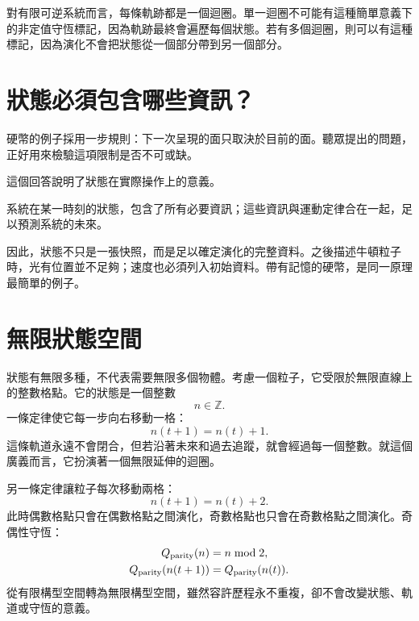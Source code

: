 對有限可逆系統而言，每條軌跡都是一個迴圈。單一迴圈不可能有這種簡單意義下的非定值守恆標記，因為軌跡最終會遍歷每個狀態。若有多個迴圈，則可以有這種標記，因為演化不會把狀態從一個部分帶到另一個部分。

\section{狀態必須包含哪些資訊？}

硬幣的例子採用一步規則：下一次呈現的面只取決於目前的面。聽眾提出的問題，正好用來檢驗這項限制是否不可或缺。

\begin{classroomqa}

\end{classroomqa}

這個回答說明了狀態在實際操作上的意義。

\begin{definition}
系統在某一時刻的狀態，包含了所有必要資訊；這些資訊與運動定律合在一起，足以預測系統的未來。
\end{definition}

因此，狀態不只是一張快照，而是足以確定演化的完整資料。之後描述牛頓粒子時，光有位置並不足夠；速度也必須列入初始資料。帶有記憶的硬幣，是同一原理最簡單的例子。

\section{無限狀態空間}

狀態有無限多種，不代表需要無限多個物體。考慮一個粒子，它受限於無限直線上的整數格點。它的狀態是一個整數
\[
  n\in\mathbb Z.
\]
一條定律使它每一步向右移動一格：
\begin{equation}
  n(t+1)=n(t)+1.
  \label{eq:lattice-one}
\end{equation}
這條軌道永遠不會閉合，但若沿著未來和過去追蹤，就會經過每一個整數。就這個廣義而言，它扮演著一個無限延伸的迴圈。

另一條定律讓粒子每次移動兩格：
\begin{equation}
  n(t+1)=n(t)+2.
  \label{eq:lattice-two}
\end{equation}
此時偶數格點只會在偶數格點之間演化，奇數格點也只會在奇數格點之間演化。奇偶性守恆：
\begin{equation}
  \begin{aligned}
    Q_{\rm parity}(n)&=n\bmod 2,\\
    Q_{\rm parity}(n(t+1))&=Q_{\rm parity}(n(t)).
  \end{aligned}
\end{equation}
從有限構型空間轉為無限構型空間，雖然容許歷程永不重複，卻不會改變狀態、軌道或守恆的意義。

